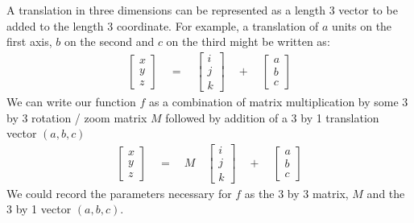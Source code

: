 \documentclass[letterpaper,10pt,english]{sphinxmanual}
\begin{document}
A translation in three dimensions can be represented as a length 3 vector to
be added to the length 3 coordinate.  For example, a translation of \(a\) units
on the first axis, \(b\) on the second and \(c\) on the third might be written
as:
\begin{equation*}
\begin{split}
\begin{bmatrix}
x \\
y \\
z
\end{bmatrix}
\quad
=
\quad
\begin{bmatrix}
i \\
j \\
k
\end{bmatrix}
\quad
+
\quad
\begin{bmatrix}
a \\
b \\
c 
\end{bmatrix}
\end{split}
\end{equation*}
We can write our function \(f\) as a combination of matrix multiplication by some 3 by 3 rotation / zoom matrix \(M\) followed by addition of a 3 by 1 translation vector \((a, b, c)\)
\begin{equation*}
\begin{split}
\begin{bmatrix}
x \\
y \\
z
\end{bmatrix}
\quad
=
\quad
M
\quad
\begin{bmatrix}
i \\
j \\
k
\end{bmatrix}
\quad
+
\quad
\begin{bmatrix}
a \\
b \\
c
\end{bmatrix}
\end{split}
\end{equation*}
We could record the parameters necessary for \(f\) as the 3 by 3 matrix, \(M\)
and the 3 by 1 vector \((a, b, c)\).
\end{document}
